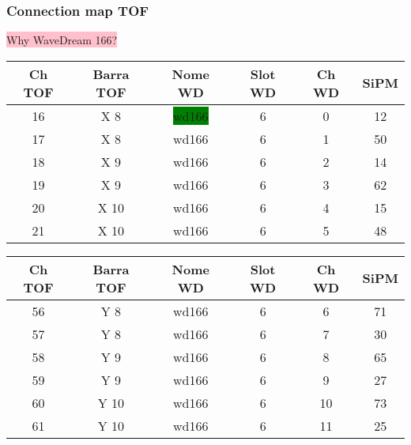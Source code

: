 \begin{frame} [fragile]
\small
	\frametitle{Connection map TOF}
	
	\colorbox{pink}{Why WaveDream 166?}

\begin{center}
\begin{tabular}{ |c|c|c|c|c|c| } 
 	\hline
 	\textbf{Ch TOF} & \textbf{Barra TOF} & \textbf{Nome WD} & \textbf{Slot WD} & \textbf{Ch WD} & \textbf{SiPM}  \\
	 \hline
	 16 & X 8 & \colorbox{green}{wd166} & 6 & 0 & 12 \\ 
	 \hline
	 17 & X 8 & wd166 & 6 & 1 & 50 \\ 
	 \hline
	 18 & X 9 & wd166 & 6 & 2 & 14 \\ 
	 \hline
	 19 & X 9 & wd166 & 6 & 3 & 62 \\ 
	 \hline
	 20 & X 10 & wd166 & 6 & 4 & 15 \\ 
	 \hline
	 21 & X 10 & wd166 & 6 & 5 & 48 \\ 
	 \hline
\end{tabular}
\end{center}

\begin{center}
\begin{tabular}{ |c|c|c|c|c|c| } 
 	\hline
 	\textbf{Ch TOF} & \textbf{Barra TOF} & \textbf{Nome WD} & \textbf{Slot WD} & \textbf{Ch WD} & \textbf{SiPM}  \\
	 \hline
	 56 & Y 8 & wd166 & 6 & 6 & 71 \\ 
	 \hline
	 57 & Y 8 & wd166 & 6 & 7 & 30 \\ 
	 \hline
	 58 & Y 9 & wd166 & 6 & 8 & 65 \\ 
	 \hline
	 59 & Y 9 & wd166 & 6 & 9 & 27 \\ 
	 \hline
	 60 & Y 10 & wd166 & 6 & 10 & 73 \\ 
	 \hline
	 61 & Y 10 & wd166 & 6 & 11 & 25 \\ 
	 \hline
\end{tabular}
\end{center}

\end{frame}